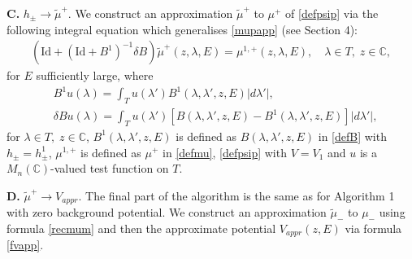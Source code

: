 \documentclass[11pt,a4paper,english,subeqn]{amsart}
\theoremstyle{plain}
\theoremstyle{definition}
\numberwithin{equation}{section}
\begin{document}
{\bf C.} $h_{\pm} \longrightarrow \tilde \mu^+$. We construct an approximation $\tilde \mu^+$ to $\mu^+$ of \eqref{defpsip} via the following integral equation which generalises \eqref{mupapp} (see Section 4):
\begin{align} \label{mupapp2}
(\mathrm{Id} +(\mathrm{Id}+B^1)^{-1}\delta B) \tilde \mu^+(z,\lambda,E) = \mu^{1,+}(z,\lambda,E),  \quad \lambda \in T, \; z \in {\mathbb{C}},
\end{align}
for $E$ sufficiently large, where
\begin{align}
&B^1 u(\lambda) = \int_T u(\lambda') B^1(\lambda,\lambda',z,E)  |d\lambda'|,\\
&\delta B u(\lambda) = \int_T u(\lambda') [B(\lambda, \lambda', z,E)-B^1(\lambda,\lambda',z,E)]  |d\lambda'|,
\end{align}
for $\lambda \in T, \; z \in {\mathbb{C}}$, $B^1(\lambda,\lambda',z,E)$ is defined as $B(\lambda,\lambda',z,E)$ in \eqref{defB} with $h_{\pm} = h^1_{\pm}$, $\mu^{1,+}$ is defined as $\mu^{+}$ in \eqref{defmu}, \eqref{defpsip} with $V=V_1$ and $u$ is a ${M_{n}({\mathbb{C}})}$-valued test function on $T$.

{\bf D.} $\tilde \mu^+ \longrightarrow V_{appr}$. The final part of the algorithm is the same as for Algorithm 1 with zero background potential. We construct an approximation $\tilde \mu_-$ to $\mu_-$ using formula \eqref{recmum} and then the approximate potential $V_{appr}(z,E)$ via formula \eqref{fvapp}.\smallskip
\end{document}
